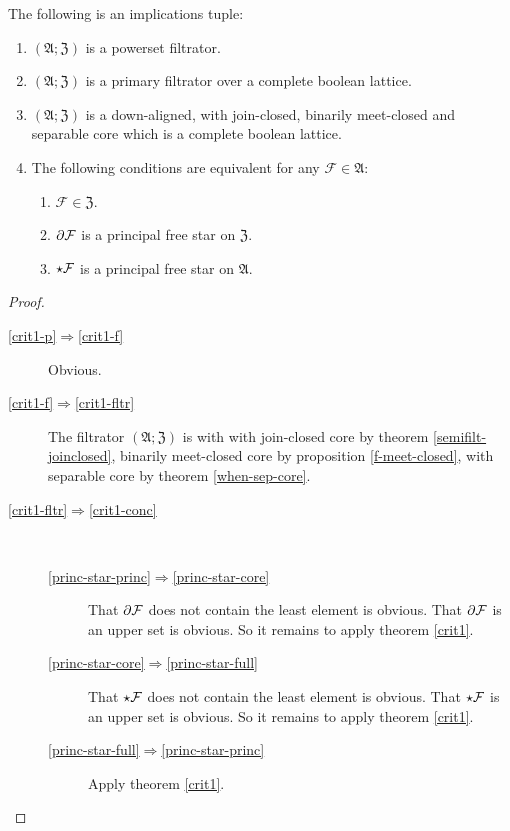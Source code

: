 \begin{prop}
\label{compl-eq-princ}The following is an implications tuple:
\begin{enumerate}
\item \label{crit1-p-1}$(\mathfrak{A};\mathfrak{Z})$ is a powerset filtrator.
\item \label{crit1-f-1}$(\mathfrak{A};\mathfrak{Z})$ is a primary filtrator
over a complete boolean lattice.
\item \label{crit1-fltr-1}$(\mathfrak{A};\mathfrak{Z})$ is a down-aligned,
with join-closed, binarily meet-closed and separable core which is
a complete boolean lattice.
\item \label{crit1-conc-1}The following conditions are equivalent for any
$\mathcal{F}\in\mathfrak{A}$:

\begin{enumerate}
\item \label{princ-star-princ}$\mathcal{F}\in\mathfrak{Z}$.
\item \label{princ-star-core}$\partial\mathcal{F}$ is a principal free
star on $\mathfrak{Z}$.
\item \label{princ-star-full}$\star\mathcal{F}$ is a principal free
star on $\mathfrak{A}$.
\end{enumerate}
\end{enumerate}
\end{prop}
\begin{proof}
~
\begin{description}
\item [{\ref{crit1-p}$\Rightarrow$\ref{crit1-f}}] Obvious.
\item [{\ref{crit1-f}$\Rightarrow$\ref{crit1-fltr}}] The filtrator $(\mathfrak{A};\mathfrak{Z})$
is with with join-closed core by theorem \ref{semifilt-joinclosed},
binarily meet-closed core by proposition \ref{f-meet-closed}, with
separable core by theorem \ref{when-sep-core}.
\item [{\ref{crit1-fltr}$\Rightarrow$\ref{crit1-conc}}] ~

\begin{description}
\item [{\ref{princ-star-princ}$\Rightarrow$\ref{princ-star-core}}] That
$\partial\mathcal{F}$ does not contain the least element is obvious.
That $\partial\mathcal{F}$ is an upper set is obvious. So it remains
to apply theorem \ref{crit1}.
\item [{\ref{princ-star-core}$\Rightarrow$\ref{princ-star-full}}] That
$\star\mathcal{F}$ does not contain the least element is obvious.
That $\star\mathcal{F}$ is an upper set is obvious. So it remains
to apply theorem \ref{crit1}.
\item [{\ref{princ-star-full}$\Rightarrow$\ref{princ-star-princ}}] Apply
theorem \ref{crit1}.
\end{description}
\end{description}
\end{proof}
